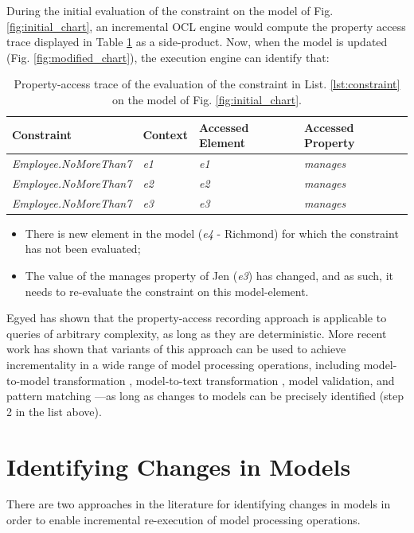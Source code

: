 \documentclass{llncs}
\begin{document}
During the initial evaluation of the constraint on the model of Fig. \ref{fig:initial_chart}, an incremental OCL engine would compute the property access trace displayed in Table \ref{tab:property_access_trace} as a side-product. Now, when the model is updated (Fig. \ref{fig:modified_chart}), the execution engine can identify that:

\begin{table}[b]
\centering
\caption{Property-access trace of the evaluation of the constraint in List. \ref{lst:constraint} on the model of Fig. \ref{fig:initial_chart}.}
\begin{tabular}{p{4.8cm} p{2.1cm} p{2cm} p{2.1cm}}
\hline 
\textbf{Constraint} & \textbf{Context} & \textbf{Accessed Element} & \textbf{Accessed Property} \\ 
\hline 
\emph{Employee.NoMoreThan7}  & \emph{e1} & \emph{e1} & \emph{manages} \\ 
\emph{Employee.NoMoreThan7}  & \emph{e2} & \emph{e2} & \emph{manages} \\ 
\emph{Employee.NoMoreThan7}  & \emph{e3} & \emph{e3} & \emph{manages} \\ 
\hline 
\end{tabular} 
\label{tab:property_access_trace}
\end{table}

\begin{itemize}
\item There is new element in the model (\emph{e4} - Richmond) for which the constraint has not been evaluated;
\item The value of the manages property of Jen (\emph{e3}) has changed, and as such, it needs to re-evaluate the constraint on this model-element.
\end{itemize}

Egyed has shown that the property-access recording approach is applicable to queries of arbitrary complexity, as long as they are deterministic. More recent work has shown that variants of this approach can be used to achieve incrementality in a wide range of model processing operations, including model-to-model transformation \cite{jouault2010towards}, model-to-text transformation \cite{ogunyomi2015property}, model validation, and pattern matching \cite{rath2012derived}---as long as changes to models can be precisely identified (step 2 in the list above).

\section{Identifying Changes in Models}
\label{sec:identifying_changes_in models}
There are two approaches in the literature for identifying changes in models in order to enable incremental re-execution of model processing operations.
\end{document}
